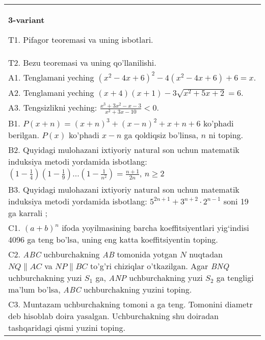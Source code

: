 \documentclass{article}
\begin{document}
\begin{tabular}{m{17cm}}
\textbf{3-variant}
\newline

T1. Pifagor teoremasi va uning isbotlari. \\
T2. Bezu teoremasi va uning qo'llanilishi. \\
A1. Tenglamani yeching \(\left( x^{2} - 4x + 6 \right)^{2} - 4\left( x^{2} - 4x + 6 \right) + 6 = x\). \\
A2. Tenglamani yeching \((x + 4)(x + 1) - 3\sqrt{x^{2} + 5x + 2} = 6\). \\
A3. Tengsizlikni yeching: \(\frac{x^{3} + 3x^{2} - x - 3}{x^{2} + 3x - 10} < 0\). \\
B1. \(P(x + n) = (x + n)^{3} + (x - n)^{2} + x + n + 6\) ko'phadi berilgan. \(P(x)\) ko'phadi \(x - n\) ga qoldiqsiz bo'linsa, \(n\) ni toping. \\
B2. Quyidagi mulohazani ixtiyoriy natural son uchun matematik induksiya metodi yordamida isbotlang: \(\left( 1 - \frac{1}{4} \right)\left( 1 - \frac{1}{9} \right)...\left( 1 - \frac{1}{n^{2}} \right) = \frac{n + 1}{2n}\), \(n \geq 2\) \\
B3. Quyidagi mulohazani ixtiyoriy natural son uchun matematik induksiya metodi yordamida isbotlang: \(5^{2n + 1} + 3^{n + 2} \cdot 2^{n - 1}\) soni 19 ga karrali ; \\
C1. \((a + b)^{n}\) ifoda yoyilmasining barcha koeffitsiyentlari yig`indisi 4096 ga teng bo'lsa, uning eng katta koeffitsiyentin toping. \\
C2. \emph{ABC} uchburchakning \emph{AB} tomonida yotgan \(N\) nuqtadan \(NQ\| AC\) va \(NP\| BC\) to'g'ri chiziqlar o'tkazilgan. Agar \emph{BNQ} uchburchakning yuzi \(S_{1}\) ga, \emph{ANP} uchburchakning yuzi \(S_{2}\) ga tengligi ma'lum bo'lsa, \emph{ABC} uchburchakning yuzini toping. \\
C3. Muntazam uchburchakning tomoni a ga teng. Tomonini diametr deb hisoblab doira yasalgan. Uchburchakning shu doiradan tashqaridagi qismi yuzini toping. \\

\end{tabular}
\vspace{1cm}
\end{document}
